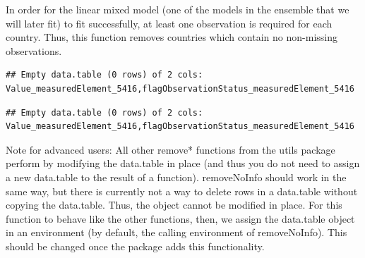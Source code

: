 \documentclass[nojss]{jss}
\begin{document}
In order for the linear mixed model (one of the models in the ensemble that
we will later fit) to fit successfully, at least one
observation is required for each country. Thus, this function removes
countries which contain no non-missing observations.

\begin{knitrout}
\color{fgcolor}\begin{kframe}
\begin{alltt}
\hlstd{okraProcessed[geographicAreaM49} \hlopt{==} \hlstd{,}
                \hlstd{flagObservationStatus_measuredElement_5416)]}
\end{alltt}
\begin{verbatim}
## Empty data.table (0 rows) of 2 cols: Value_measuredElement_5416,flagObservationStatus_measuredElement_5416
\end{verbatim}
\begin{alltt}
\hlstd{(} 
              \hlstd{=} \hlstd{,}
              \hlstd{=} \hlstd{,}
              \hlstd{=} \hlstd{)}
\hlstd{okraProcessed[geographicAreaM49} \hlopt{==} \hlstd{,}
                \hlstd{flagObservationStatus_measuredElement_5416)]}
\end{alltt}
\begin{verbatim}
## Empty data.table (0 rows) of 2 cols: Value_measuredElement_5416,flagObservationStatus_measuredElement_5416
\end{verbatim}
\end{kframe}
\end{knitrout}

Note for advanced users: All other remove* functions from the utils package
perform by modifying the data.table in place (and thus you do not need to
assign a new data.table to the result of a function).  removeNoInfo should work
in the same way, but there is currently not a way to delete rows in a
data.table without copying the data.table.  Thus, the object cannot be modified
in place.  For this function to behave like the other functions, then, we
assign the data.table object in an environment (by default, the calling
environment of removeNoInfo).  This should be changed once the 
package adds this functionality.
\end{document}
